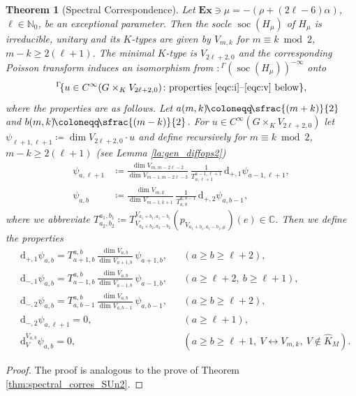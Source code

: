 \documentclass[JEP,XML,SOM,NoFloatCountersInSection,Unicode,published]{cedram}
\newcommand{\Ga}{{}^\Gamma\!}
\newcommand{\psfrac}[2]{\sfrac{(#1)}{#2}}
\newtheorem{theorem}{Theorem}[section]
\theoremstyle{definition}
\newcommand{\lra}{\ensuremath{\leftrightarrow}}
\newcommand{\on}[1]{\ensuremath{\operatorname{#1}}}
\newcommand{\rhoa}{\ensuremath{\rho}}
\newcommand{\N}{\ensuremath{\mathbb{N}}}
\newcommand{\C}{\ensuremath{\mathbb{C}}}
\newcommand{\pst}[1]{\ensuremath{H_{#1}}}
\begin{document}
\begin{theorem}[Spectral Correspondence]\label{thm:spectral_corres_F4}
Let $\mathbf{Ex}\ni\mu=-(\rhoa+(2\ell-6)\alpha)$, $\ell\in\N_0$, be an exceptional parameter. Then the socle $\on{soc}(\pst{\mu})$ of $\pst{\mu}$ is irreducible, unitary and its $K$-types are given by $V_{m,k}$ for $m\equiv k\bmod2$, $m-k\geq2(\ell+1)$. The minimal $K$-type is $V_{2\ell+2,0}$ and the corresponding Poisson transform induces an isomorphism from $\colon\Ga(\on{soc}(\pst{\mu}))^{-\infty}$ onto
\[
\Ga\{u\in C^\infty(G\times_KV_{2\ell+2,0})\colon \text{properties \eqref{eqc:i}--\eqref{eqc:v} below}\},
\]
where the properties are as follows. Let $a(m,k)\!\coloneqq\!\psfrac{m+k}{2}$ and $b(m,k)\!\coloneqq\!\psfrac{m-k}{2}$. For $u\in C^\infty(G\times_KV_{2\ell+2,0})$ let $\psi_{\ell+1,\ell+1}\coloneqq\dim V_{2\ell+2,0}\cdot u$ and define recursively for $m\equiv k\bmod2$, $m-k\geq2(\ell+1)$ (see Lemma \ref{la:gen_diffops2})
\begin{align*}
\psi_{a,\ell+1}&\coloneqq\frac{\dim V_{m,m-2\ell-2}}{\dim V_{m-1,m-2\ell-3}}\,\frac{1}{T^{a-1,\ell+1}_{a,\ell+1}}\,\mathrm{d}_{+,1}\psi_{a-1,\ell+1},\\
\psi_{a,b}&\coloneqq\frac{\dim V_{m,k}}{\dim V_{m-1,k+1}}\,\frac{1}{T^{a,b-1}_{a,b}}\,\mathrm{d}_{+,2}\psi_{a,b-1},
\end{align*}
where we abbreviate $T^{a_1,b_1}_{a_2,b_2}\coloneqq T_{V_{a_2+b_2,a_2-b_2}}^{V_{a_1+b_1,a_1-b_1}}(p_{V_{a_1+b_1,a_1-b_1,\mu}})(e)\in\C$. Then we define the properties
\begin{align*}
\tag{i}\label{eqc:i}&\mathrm{d}_{+,1}\psi_{a,b}=T_{a+1,b}^{a,b}\,\frac{\dim V_{a,b}}{\dim V_{a+1,b}}\,\psi_{a+1,b},&& (a\geq b\geq\ell+2),\\
\tag{ii}\label{eqc:ii}&\mathrm{d}_{-,1}\psi_{a,b}=T_{a-1,b}^{a,b}\,\frac{\dim V_{a,b}}{\dim V_{a-1,b}}\,\psi_{a-1,b},&& (a\geq\ell+2,\ b\geq\ell+1),\\
\tag{iii}\label{eqc:iii}&\mathrm{d}_{-,2}\psi_{a,b}=T_{a,b-1}^{a,b}\,\frac{\dim V_{a,b}}{\dim V_{a,b-1}}\,\psi_{a,b-1},&& (a\geq b\geq\ell+2),\\
\tag{iv}\label{eqc:iv}&\mathrm{d}_{-,2}\psi_{a,\ell+1}=0,&& (a\geq\ell+1),\\
\tag{v}\label{eqc:v}&\mathrm{d}^{V_{a,b}}_V\psi_{a,b}=0,&& (a\geq b\geq\ell+1,\ V\lra V_{m,k},\ V\not\in\hat K_M).
\end{align*}
\end{theorem}

\begin{proof}
The proof is analogous to the prove of Theorem \ref{thm:spectral_corres_SUn2}.
\end{proof}
\end{document}
